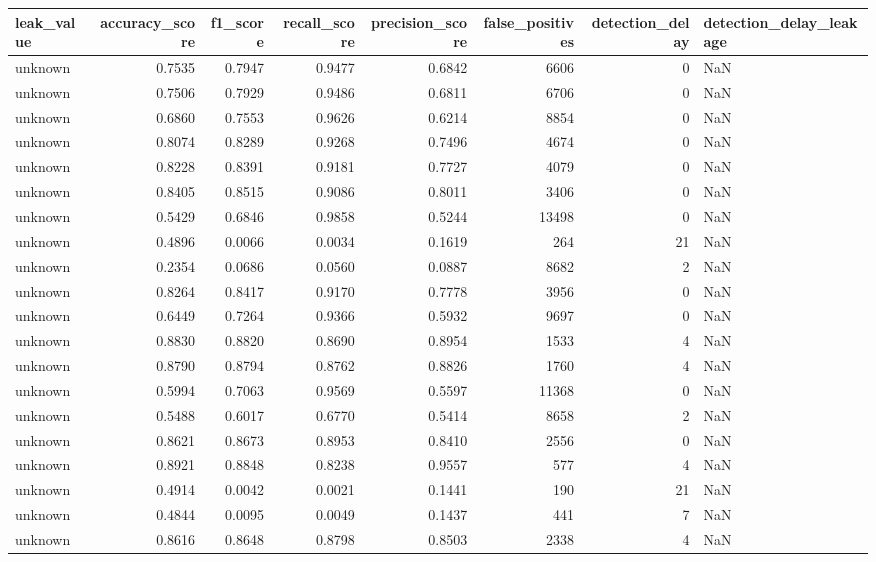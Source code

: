 \begin{tabular}{lrrrrrrl}
\toprule
leak\_value & accuracy\_score & f1\_score & recall\_score & precision\_score & false\_positives & detection\_delay & detection\_delay\_leakage \\
\midrule
unknown & 0.7535 & 0.7947 & 0.9477 & 0.6842 & 6606 & 0 & NaN \\
unknown & 0.7506 & 0.7929 & 0.9486 & 0.6811 & 6706 & 0 & NaN \\
unknown & 0.6860 & 0.7553 & 0.9626 & 0.6214 & 8854 & 0 & NaN \\
unknown & 0.8074 & 0.8289 & 0.9268 & 0.7496 & 4674 & 0 & NaN \\
unknown & 0.8228 & 0.8391 & 0.9181 & 0.7727 & 4079 & 0 & NaN \\
unknown & 0.8405 & 0.8515 & 0.9086 & 0.8011 & 3406 & 0 & NaN \\
unknown & 0.5429 & 0.6846 & 0.9858 & 0.5244 & 13498 & 0 & NaN \\
unknown & 0.4896 & 0.0066 & 0.0034 & 0.1619 & 264 & 21 & NaN \\
unknown & 0.2354 & 0.0686 & 0.0560 & 0.0887 & 8682 & 2 & NaN \\
unknown & 0.8264 & 0.8417 & 0.9170 & 0.7778 & 3956 & 0 & NaN \\
unknown & 0.6449 & 0.7264 & 0.9366 & 0.5932 & 9697 & 0 & NaN \\
unknown & 0.8830 & 0.8820 & 0.8690 & 0.8954 & 1533 & 4 & NaN \\
unknown & 0.8790 & 0.8794 & 0.8762 & 0.8826 & 1760 & 4 & NaN \\
unknown & 0.5994 & 0.7063 & 0.9569 & 0.5597 & 11368 & 0 & NaN \\
unknown & 0.5488 & 0.6017 & 0.6770 & 0.5414 & 8658 & 2 & NaN \\
unknown & 0.8621 & 0.8673 & 0.8953 & 0.8410 & 2556 & 0 & NaN \\
unknown & 0.8921 & 0.8848 & 0.8238 & 0.9557 & 577 & 4 & NaN \\
unknown & 0.4914 & 0.0042 & 0.0021 & 0.1441 & 190 & 21 & NaN \\
unknown & 0.4844 & 0.0095 & 0.0049 & 0.1437 & 441 & 7 & NaN \\
unknown & 0.8616 & 0.8648 & 0.8798 & 0.8503 & 2338 & 4 & NaN \\
\bottomrule
\end{tabular}
